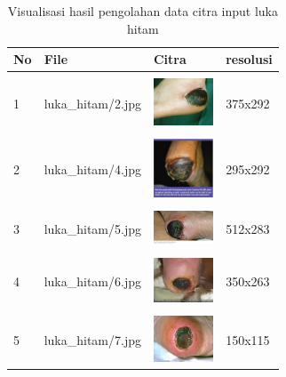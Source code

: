 \begin{table}[H]
	\centering
	\caption{Visualisasi hasil pengolahan data citra input luka hitam}
	\label{tabel_input}
	\begin{tabular}{|m{0.2in}|m{1.2in}|m{0.7in}|m{0.7in}|}
		\hline
		\textbf{No} & \textbf{File} & \textbf{Citra} & \textbf{resolusi} \\
		\hline
		
		& &  &  \\
		1 & 
		luka\_hitam/2.jpg &
		\includegraphics[width=0.7in]{gambar/dataset_citra/luka_hitam/2.jpg}&
		375x292\\
		\hline
		
		& &  &  \\
		2 & 
		luka\_hitam/4.jpg &
		\includegraphics[width=0.7in]{gambar/dataset_citra/luka_hitam/4.jpg}&
		295x292\\
		\hline
		
		& &  &  \\
		3 & 
		luka\_hitam/5.jpg &
		\includegraphics[width=0.7in]{gambar/dataset_citra/luka_hitam/5.jpg}&
		512x283\\
		\hline
		
		& &  &  \\
		4& 
		luka\_hitam/6.jpg &
		\includegraphics[width=0.7in]{gambar/dataset_citra/luka_hitam/6.jpg}&
		350x263\\
		\hline
		
		& &  &  \\
		5& 
		luka\_hitam/7.jpg &
		\includegraphics[width=0.7in]{gambar/dataset_citra/luka_hitam/7.jpg}&
		150x115\\
		\hline
		

\end{tabular}
\end{table}
